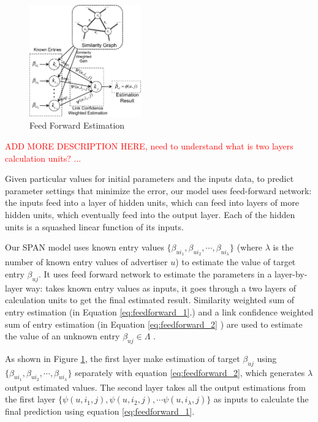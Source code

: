 \begin{figure}[!ht]
  \centering
  \includegraphics[width=0.43\textwidth]{figures/trainer_feedforward.pdf}
  \caption{Feed Forward Estimation}
  \label{fig:trainer-feedforward}
\end{figure}

\textcolor{red}{ADD MORE DESCRIPTION HERE, need to understand what is
  two layers calculation units? ...}

Given particular values for initial parameters and the inputs data, to
predict parameter settings that minimize the error, our model uses
feed-forward network: the inputs feed into a layer of hidden units,
which can feed into layers of more hidden units, which eventually feed
into the output layer. Each of the hidden units is a squashed linear
function of its inputs.

Our SPAN model uses known entry values $\{\beta_{ui_1}, \beta_{ui_2},
\cdots, \beta_{ui_\lambda}\}$ (where $\lambda$ is the number of known
entry values of advertiser $u$) to estimate the value of target entry
$\beta_{uj}$.  It uses feed forward network to estimate the parameters
in a layer-by-layer way: takes known entry values as inputs, it goes
through a two layers of calculation units to get the final estimated
result.  Similarity weighted sum of entry estimation (in Equation
\ref{eq:feedforward_1}.) and a link confidence weighted sum of entry
estimation (in Equation \ref{eq:feedforward_2} ) are used to estimate
the value of an unknown entry $\beta_{uj} \in \Lambda$ .

As shown in Figure \ref{fig:trainer-feedforward}, the first layer make
estimation of target $\beta_{uj}$ using $\{\beta_{ui_1}, \beta_{ui_2},
\cdots, \beta_{ui_\lambda}\}$ separately with equation
\ref{eq:feedforward_2}, which generates $\lambda$ output estimated
values. The second layer takes all the output estimations from the
first layer $\{\psi(u,i_1,j),\psi(u,i_2,j),\cdots
\psi(u,i_\lambda,j)\}$ as inputs to calculate the final prediction
using equation \ref{eq:feedforward_1}.


